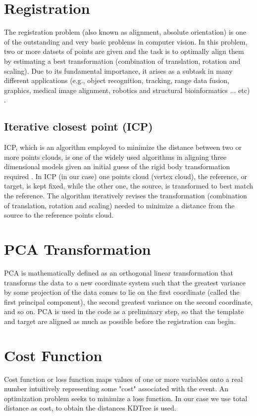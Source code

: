 \documentclass[../structure.tex]{subfiles}
\begin{document}
\section{Registration}
	The registration problem (also known as alignment, absolute orientation) is one of the outstanding and very basic problems in computer vision. In this problem, two or more datsets of points are given and the task is to optimally align them by estimating a best transformation (combination of translation, rotation and scaling). Due to its fundamental importance, it arises as a subtask in many different applications (e.g., object recognition, tracking, range data fusion, graphics, medical image alignment, robotics and structural bioinformatics ... etc) \cite{Li2007}.
		\subsection{Iterative closest point (ICP)}
		 ICP, which is an algorithm employed to minimize the distance between two or more points clouds, is one of the widely used algorithms in aligning three dimensional models given an initial guess of the rigid body transformation required \cite{Zhang1994}.
		 In ICP (in our case) one points cloud (vertex cloud), the reference, or target, is kept fixed, while the other one, the source, is transformed to best match the reference. The algorithm iteratively revises the transformation (combination of translation, rotation and scaling) needed to minimize a distance from the source to the reference points cloud.
\section{PCA Transformation}
PCA is mathematically defined as an orthogonal linear transformation that transforms the data to a new coordinate system such that the greatest variance by some projection of the data comes to lie on the first coordinate (called the first principal component), the second greatest variance on the second coordinate, and so on\cite{Jolliffe2002}.
PCA is used in the code as a preliminary step, so that the template and target are aligned as much as possible before the registration can begin.
\section{Cost Function}
Cost function or loss function maps values of one or more variables onto a real number intuitively representing some "cost" associated with the event. An optimization problem seeks to minimize a loss function\cite{Wald1950}. In our case we use total distance as cost, to obtain the distances KDTree is used.
\end{document}
